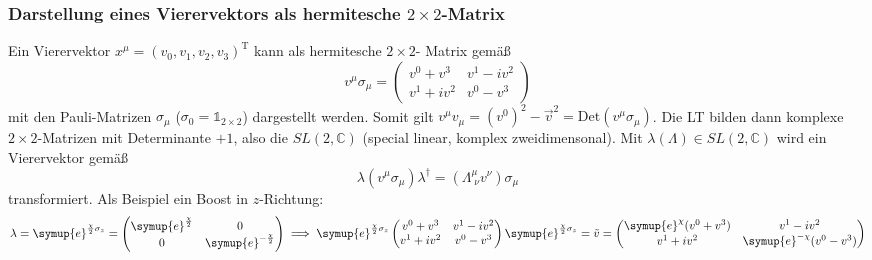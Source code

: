 \documentclass[
  captions=tableheading,  %
  titlepage=firstiscover, %
]{scrartcl}
\begin{document}
\subsubsection{Darstellung eines Vierervektors als hermitesche \texorpdfstring{$2 \times 2$}{PDFstring}-Matrix}
\label{sub:2times2}
Ein Vierervektor $x^{\mu} = (v_0, v_1, v_2, v_3)^\text{T}$ kann als 
hermitesche $2 \times 2$- Matrix gemäß
\begin{equation*}
  v^{\mu} \sigma_{\mu} = 
  \begin{pmatrix}
    v^0 + v^3& v^1 - iv^2 \\
    v^1 + iv^2 & v^0 - v^3
  \end{pmatrix}
\end{equation*}
mit den Pauli-Matrizen $\sigma_{\mu}$ ($\sigma_0 = \mathbb{1}_{2 \times 2}$) dargestellt werden.
Somit gilt $v^{\mu} v_{\mu} = {(v^0)^2 - \vec{v}^2} = \text{Det}(v^{\mu} \sigma_{\mu})$.
Die LT bilden dann komplexe $2\times 2$-Matrizen mit Determinante $+ 1$, also  
die $SL(2, \mathbb{C})$ (special linear, komplex zweidimensonal).
Mit $\lambda(\Lambda) \in SL(2, \mathbb{C})$ wird ein Vierervektor gemäß
\begin{equation*}
  \lambda (v^{\mu} \sigma_{\mu}) \lambda^{\dagger} = (\Lambda_{\; \nu}^{\mu} v^{\nu}) \sigma_{\mu}
\end{equation*}
transformiert.
Als Beispiel ein Boost in $z$-Richtung:
\begin{equation*}
  \lambda  = \symup{e}^{\frac{\chi}{2} \sigma_z}
  =
  \begin{pmatrix}
    \symup{e}^{\frac{\chi}{2}} & 0 \\
    0 & \symup{e}^{-\frac{\chi}{2}}
  \end{pmatrix}
  \implies  
  \symup{e}^{\frac{\chi}{2} \sigma_z} 
  \begin{pmatrix}
    v^0 + v^3& v^1 - iv^2 \\
    v^1 + iv^2 & v^0 - v^3
  \end{pmatrix}
  \symup{e}^{\frac{\chi}{2} \sigma_z} 
  = \tilde{v} =
  \begin{pmatrix}
    \symup{e}^{\chi} (v^0 + v^3) & v^1 - iv^2 \\
    v^1 + iv^2 & \symup{e}^{-\chi}(v^0 - v^3)
  \end{pmatrix}
\end{equation*}
\end{document}

